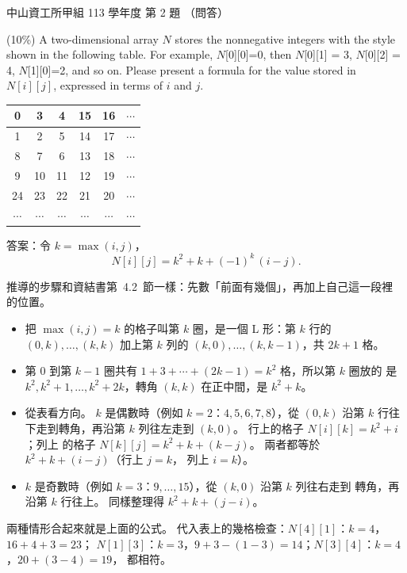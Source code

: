 \begin{pastexam}[label={px:nsysu-113-osds-02}]{中山資工所甲組 113 學年度 第 2 題}
（問答）

(10\%) A two-dimensional array $N$ stores the nonnegative integers with the style shown in
the following table. For example, $N$[0][0]=0, then $N$[0][1] = 3, $N$[0][2] = 4,
$N$[1][0]=2, and so on. Please present a formula for the value stored in $N[i][j]$,
expressed in terms of $i$ and $j$.
\begin{center}
\begin{tabular}{|c|c|c|c|c|c|}\hline
0 & 3 & 4 & 15 & 16 & $\cdots$\\\hline
1 & 2 & 5 & 14 & 17 & $\cdots$\\\hline
8 & 7 & 6 & 13 & 18 & $\cdots$\\\hline
9 & 10 & 11 & 12 & 19 & $\cdots$\\\hline
24 & 23 & 22 & 21 & 20 & $\cdots$\\\hline
$\cdots$ & $\cdots$ & $\cdots$ & $\cdots$ & $\cdots$ & $\cdots$\\\hline
\end{tabular}
\end{center}
\end{pastexam}

\begin{pastsoln}
答案：令 $k = \max(i, j)$，
\[
N[i][j] = k^2 + k + (-1)^k\,(i - j) .
\]

推導的步驟和資結書第~4.2~節一樣：先數「前面有幾個」，再加上自己這一段裡
的位置。
\begin{itemize}
\item 把 $\max(i, j) = k$ 的格子叫第 $k$ 圈，是一個 L 形：第 $k$ 行的
$(0,k), \ldots, (k,k)$ 加上第 $k$ 列的 $(k,0), \ldots, (k,k-1)$，共 $2k + 1$ 格。
\item 第 $0$ 到第 $k - 1$ 圈共有 $1 + 3 + \cdots + (2k - 1) = k^2$ 格，所以第 $k$ 圈放的
是 $k^2, k^2 + 1, \ldots, k^2 + 2k$，轉角 $(k, k)$ 在正中間，是 $k^2 + k$。
\item 從表看方向。 $k$ 是偶數時（例如 $k = 2$：$4, 5, 6, 7, 8$），從 $(0, k)$ 沿第 $k$
行往下走到轉角，再沿第 $k$ 列往左走到 $(k, 0)$。 行上的格子 $N[i][k] = k^2 + i$；列上
的格子 $N[k][j] = k^2 + k + (k - j)$。 兩者都等於 $k^2 + k + (i - j)$（行上 $j = k$，
列上 $i = k$）。
\item $k$ 是奇數時（例如 $k = 3$：$9, \ldots, 15$），從 $(k, 0)$ 沿第 $k$ 列往右走到
轉角，再沿第 $k$ 行往上。 同樣整理得 $k^2 + k + (j - i)$。
\end{itemize}
兩種情形合起來就是上面的公式。 代入表上的幾格檢查：$N[4][1]$：$k = 4$，$16 + 4 + 3 = 23$；
$N[1][3]$：$k = 3$，$9 + 3 - (1 - 3) = 14$；$N[3][4]$：$k = 4$，$20 + (3 - 4) = 19$，
都相符。
\end{pastsoln}
